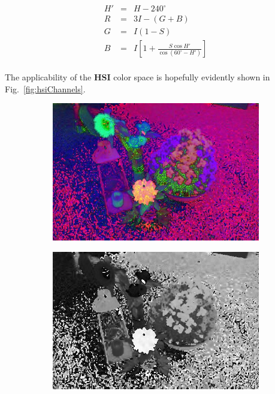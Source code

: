 \begin{equation}
	\begin{array}{lcl}
		H' & = & H-240^{\circ}\\
		R & = & 3I -(G+B)\\
		G & = & I(1-S)\\
		B & = & I \left[1+\frac{S\cos{H'}}{\cos{(60^{\circ}-H')}}\right]\\
	\end{array}
\end{equation}


The applicability of the \textbf{HSI} color space is hopefully evidently shown in Fig.~\ref{fig:hsiChannels}.

\begin{figure}[H]
    \centering
    \captionsetup[subfigure]{justification=centering}
    \begin{subfigure}[b]{0.49\textwidth}
        \centering
        \includegraphics[width=\textwidth]{./figure/appendix/color_rep/images/imgHSI.jpg}
		\caption{}
		\label{fig:imgHSI}
    \end{subfigure}
    \begin{subfigure}[b]{0.49\textwidth}
        \centering
        \includegraphics[width=\textwidth]{./figure/appendix/color_rep/images/imgH.jpg}

\end{subfigure}
\end{figure}
